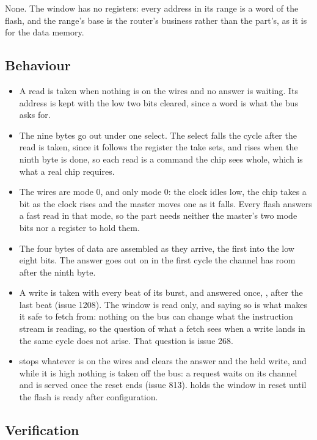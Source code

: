 None. The window has no registers: every address in its range is a
word of the flash, and the range's base is the router's business
rather than the part's, as it is for the data memory.


\subsection*{Behaviour}

\begin{itemize}
\item A read is taken when nothing is on the wires and no answer is
waiting. Its address is kept with the low two bits cleared, since a
word is what the bus asks for.
\item The nine bytes go out under one select. The select falls the
cycle after the read is taken, since it follows the 
register the take sets, and rises when the ninth byte is done, so
each read is a command the chip sees whole, which is what a real chip
requires.
\item The wires are mode 0, and only mode 0: the clock idles low, the
chip takes a bit as the clock rises and the master moves one as it
falls. Every flash answers a fast read in that mode, so the part needs
neither the master's two mode bits nor a register to hold them.
\item The four bytes of data are assembled as they arrive, the first
into the low eight bits. The answer goes out on  in the first
cycle the channel has room after the ninth byte.
\item A write is taken with every beat of its burst, and answered once,
, after the last beat (issue 1208). The window is read
only, and saying so is what makes it
safe to fetch from: nothing on the bus can change what the instruction
stream is reading, so the question of what a fetch sees when a write
lands in the same cycle does not arise. That question is issue 268.
\item {} stops whatever is on the wires and clears the answer
and the held write, and while it is high nothing is taken off the bus:
a request waits on its channel and is served once the reset ends
(issue 813).  holds the window in reset until the
flash is ready after configuration.
\end{itemize}

\subsection*{Verification}

